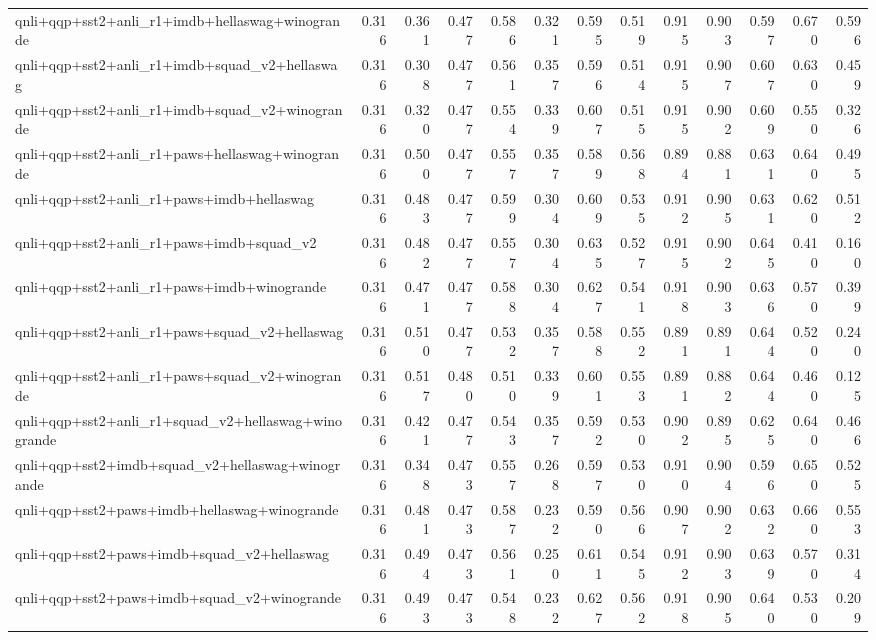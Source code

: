 \begin{table}[t]
\begin{tabular}{lrrrrrrrrrrrr}
    qnli+qqp+sst2+anli\_r1+imdb+hellaswag+winogrande & 0.316 & 0.361 & 0.477 & 0.586 & 0.321 & 0.595 & 0.519 & 0.915 & 0.903 & 0.597 & 0.670 & 0.596 \\
    qnli+qqp+sst2+anli\_r1+imdb+squad\_v2+hellaswag & 0.316 & 0.308 & 0.477 & 0.561 & 0.357 & 0.596 & 0.514 & 0.915 & 0.907 & 0.607 & 0.630 & 0.459 \\
    qnli+qqp+sst2+anli\_r1+imdb+squad\_v2+winogrande & 0.316 & 0.320 & 0.477 & 0.554 & 0.339 & 0.607 & 0.515 & 0.915 & 0.902 & 0.609 & 0.550 & 0.326 \\
    qnli+qqp+sst2+anli\_r1+paws+hellaswag+winogrande & 0.316 & 0.500 & 0.477 & 0.557 & 0.357 & 0.589 & 0.568 & 0.894 & 0.881 & 0.631 & 0.640 & 0.495 \\
    qnli+qqp+sst2+anli\_r1+paws+imdb+hellaswag & 0.316 & 0.483 & 0.477 & 0.599 & 0.304 & 0.609 & 0.535 & 0.912 & 0.905 & 0.631 & 0.620 & 0.512 \\
    qnli+qqp+sst2+anli\_r1+paws+imdb+squad\_v2 & 0.316 & 0.482 & 0.477 & 0.557 & 0.304 & 0.635 & 0.527 & 0.915 & 0.902 & 0.645 & 0.410 & 0.160 \\
    qnli+qqp+sst2+anli\_r1+paws+imdb+winogrande & 0.316 & 0.471 & 0.477 & 0.588 & 0.304 & 0.627 & 0.541 & 0.918 & 0.903 & 0.636 & 0.570 & 0.399 \\
    qnli+qqp+sst2+anli\_r1+paws+squad\_v2+hellaswag & 0.316 & 0.510 & 0.477 & 0.532 & 0.357 & 0.588 & 0.552 & 0.891 & 0.891 & 0.644 & 0.520 & 0.240 \\
    qnli+qqp+sst2+anli\_r1+paws+squad\_v2+winogrande & 0.316 & 0.517 & 0.480 & 0.510 & 0.339 & 0.601 & 0.553 & 0.891 & 0.882 & 0.644 & 0.460 & 0.125 \\
    qnli+qqp+sst2+anli\_r1+squad\_v2+hellaswag+winogrande & 0.316 & 0.421 & 0.477 & 0.543 & 0.357 & 0.592 & 0.530 & 0.902 & 0.895 & 0.625 & 0.640 & 0.466 \\
    qnli+qqp+sst2+imdb+squad\_v2+hellaswag+winogrande & 0.316 & 0.348 & 0.473 & 0.557 & 0.268 & 0.597 & 0.530 & 0.910 & 0.904 & 0.596 & 0.650 & 0.525 \\
    qnli+qqp+sst2+paws+imdb+hellaswag+winogrande & 0.316 & 0.481 & 0.473 & 0.587 & 0.232 & 0.590 & 0.566 & 0.907 & 0.902 & 0.632 & 0.660 & 0.553 \\
    qnli+qqp+sst2+paws+imdb+squad\_v2+hellaswag & 0.316 & 0.494 & 0.473 & 0.561 & 0.250 & 0.611 & 0.545 & 0.912 & 0.903 & 0.639 & 0.570 & 0.314 \\
    qnli+qqp+sst2+paws+imdb+squad\_v2+winogrande & 0.316 & 0.493 & 0.473 & 0.548 & 0.232 & 0.627 & 0.562 & 0.918 & 0.905 & 0.640 & 0.530 & 0.209 \\

\end{tabular}
\end{table}
